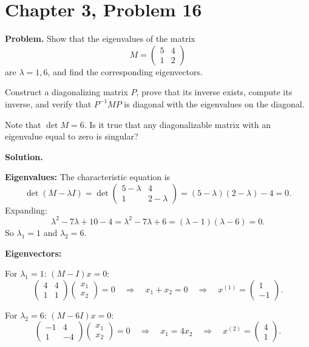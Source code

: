 \documentclass[12pt]{article}
\begin{document}
\section*{Chapter 3, Problem 16}

\textbf{Problem.} Show that the eigenvalues of the matrix
\[
M = \begin{pmatrix} 5 & 4 \\ 1 & 2 \end{pmatrix}
\]
are $\lambda = 1, 6$, and find the corresponding eigenvectors.

Construct a diagonalizing matrix $P$, prove that its inverse exists, compute its inverse, and verify that $P^{-1}MP$ is diagonal with the eigenvalues on the diagonal.

Note that $\det M = 6$. Is it true that any diagonalizable matrix with an eigenvalue equal to zero is singular?

\bigskip
\textbf{Solution.}

\textbf{Eigenvalues:} The characteristic equation is
\[
\det(M - \lambda I) = \det\begin{pmatrix} 5-\lambda & 4 \\ 1 & 2-\lambda \end{pmatrix} = (5-\lambda)(2-\lambda) - 4 = 0.
\]
Expanding:
\[
\lambda^2 - 7\lambda + 10 - 4 = \lambda^2 - 7\lambda + 6 = (\lambda - 1)(\lambda - 6) = 0.
\]
So $\lambda_1 = 1$ and $\lambda_2 = 6$.

\medskip
\textbf{Eigenvectors:}

For $\lambda_1 = 1$: $(M - I)x = 0$:
\[
\begin{pmatrix} 4 & 4 \\ 1 & 1 \end{pmatrix}\begin{pmatrix} x_1 \\ x_2 \end{pmatrix} = 0 \quad \Rightarrow \quad x_1 + x_2 = 0 \quad \Rightarrow \quad x^{(1)} = \begin{pmatrix} 1 \\ -1 \end{pmatrix}.
\]

For $\lambda_2 = 6$: $(M - 6I)x = 0$:
\[
\begin{pmatrix} -1 & 4 \\ 1 & -4 \end{pmatrix}\begin{pmatrix} x_1 \\ x_2 \end{pmatrix} = 0 \quad \Rightarrow \quad x_1 = 4x_2 \quad \Rightarrow \quad x^{(2)} = \begin{pmatrix} 4 \\ 1 \end{pmatrix}.
\]
\end{document}
